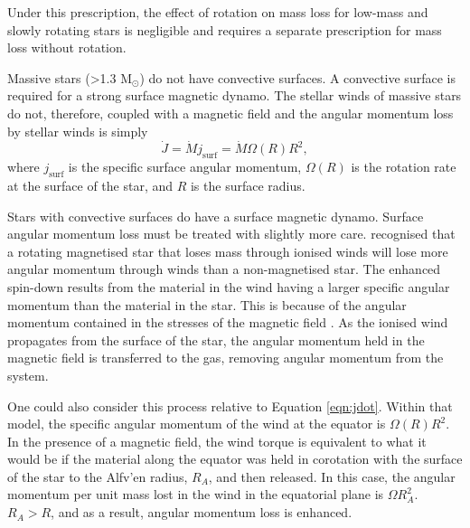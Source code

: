 Under this prescription, the effect of rotation on mass loss for low-mass and slowly rotating stars is negligible and requires a separate prescription for mass loss without rotation.

Massive stars (>1.3 M$_{\odot}$) do not have convective surfaces.
A convective surface is required for a strong surface magnetic dynamo.
The stellar winds of massive stars do not, therefore, coupled with a magnetic field and the angular momentum loss by stellar winds is simply
\begin{equation}
    \Dot{J} = \Dot{M} j_{\text{surf}} = \Dot{M} \Omega(R) R^2,
    \label{eqn:jdot}
\end{equation}
where $j_{\text{surf}}$ is the specific surface angular momentum, $\Omega(R)$ is the rotation rate at the surface of the star, and $R$ is the surface radius.

Stars with convective surfaces do have a surface magnetic dynamo.
Surface angular momentum loss must be treated with slightly more care.
\citet{parker_dynamics_1958,schatzman_theory_1962} recognised that a rotating magnetised star that loses mass through ionised winds will lose more angular momentum through winds than a non-magnetised star.
The enhanced spin-down results from the material in the wind having a larger specific angular momentum than the material in the star.
This is because of the angular momentum contained in the stresses of the magnetic field \cite{weber_angular_1967}. 
As the ionised wind propagates from the surface of the star, the angular momentum held in the magnetic field is transferred to the gas, removing angular momentum from the system.

One could also consider this process relative to Equation \ref{eqn:jdot}.
Within that model, the specific angular momentum of the wind at the equator is $\Omega(R) R^2$.
In the presence of a magnetic field, the wind torque is equivalent to what it would be if the material along the equator was held in corotation with the surface of the star to the Alfv'en radius, $R_A$, and then released. 
In this case, the angular momentum per unit mass lost in the wind in the equatorial plane is $\Omega R_A^2$.
$R_A>R$, and as a result, angular momentum loss is enhanced.


